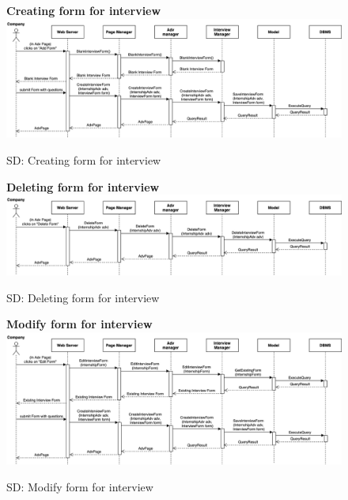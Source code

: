 \begin{figure}[H]
\textbf{Creating form for interview}\newline\newline
\includegraphics[width=15cm]{images/architectural design/runtime/DD-UC21.drawio.png}
    \caption{SD: Creating form for interview}
\end{figure}

\begin{figure}[H]
\textbf{Deleting form for interview}\newline\newline
\includegraphics[width=15cm]{images/architectural design/runtime/DD-UC22.1.drawio.png}
    \caption{SD: Deleting form for interview}
\end{figure}

\begin{figure}[H]
\textbf{Modify form for interview}\newline\newline
\includegraphics[width=15cm]{images/architectural design/runtime/DD-UC22.2.drawio.png}
    \caption{SD: Modify form for interview}
\end{figure}

